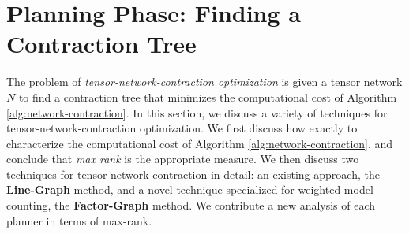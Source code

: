 \section{Planning Phase: Finding a Contraction Tree}
\label{sec:tensors:planning}
The problem of \emph{tensor-network-contraction optimization} is given a tensor network $N$ to find a contraction tree that minimizes the computational cost of Algorithm \ref{alg:network-contraction}. 
In this section, we discuss a variety of techniques for tensor-network-contraction optimization. 
We first discuss how exactly to characterize the computational cost of Algorithm \ref{alg:network-contraction}, and conclude that \emph{max rank} is the appropriate measure. 
We then discuss two techniques for tensor-network-contraction in detail: an existing approach, the \textbf{Line-Graph} method, and a novel technique specialized for weighted model counting, the \textbf{Factor-Graph} method. We contribute a new analysis of each planner in terms of max-rank.






